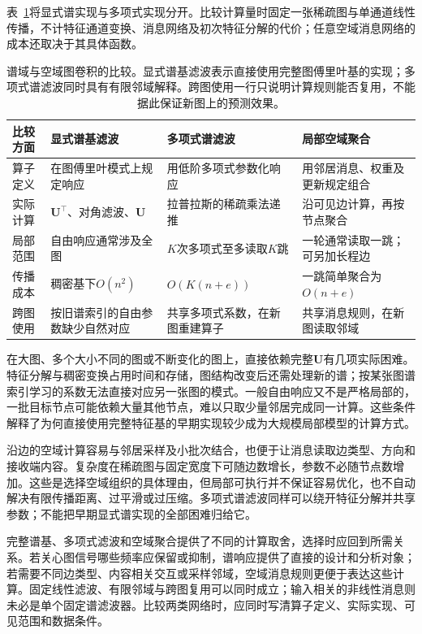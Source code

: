 表~\ref{tab:gnn-spectral-spatial}将显式谱实现与多项式实现分开。比较计算量时固定一张稀疏图与单通道线性传播，不计特征通道变换、消息网络及初次特征分解的代价；任意空域消息网络的成本还取决于其具体函数。
\begin{table}[htb]
  \centering
  \small
  \begin{tabularx}{\linewidth}{@{}p{17mm}XXX@{}}
    \toprule
    比较方面 & 显式谱基滤波 & 多项式谱滤波 & 局部空域聚合\\
    \midrule
    算子定义 & 在图傅里叶模式上规定响应 & 用低阶多项式参数化响应 & 用邻居消息、权重及更新规定组合\\
    实际计算 & $\bm{U}^{\top}$、对角滤波、$\bm{U}$ & 拉普拉斯的稀疏乘法递推 & 沿可见边计算，再按节点聚合\\
    局部范围 & 自由响应通常涉及全图 & $K$次多项式至多读取$K$跳 & 一轮通常读取一跳；可另加长程边\\
    传播成本 & 稠密基下$O(n^2)$ & $O(K(n+e))$ & 一跳简单聚合为$O(n+e)$\\
    跨图使用 & 按旧谱索引的自由参数缺少自然对应 & 共享多项式系数，在新图重建算子 & 共享消息规则，在新图读取邻域\\
    \bottomrule
  \end{tabularx}
  \caption{谱域与空域图卷积的比较。显式谱基滤波表示直接使用完整图傅里叶基的实现；多项式谱滤波同时具有有限邻域解释。跨图使用一行只说明计算规则能否复用，不能据此保证新图上的预测效果。}
  \label{tab:gnn-spectral-spatial}
\end{table}

在大图、多个大小不同的图或不断变化的图上，直接依赖完整$\bm{U}$有几项实际困难。特征分解与稠密变换占用时间和存储，图结构改变后还需处理新的谱；按某张图谱索引学习的系数无法直接对应另一张图的模式。一般自由响应又不是严格局部的，一批目标节点可能依赖大量其他节点，难以只取少量邻居完成同一计算。这些条件解释了为何直接使用完整特征基的早期实现较少成为大规模局部模型的计算方式。

沿边的空域计算容易与邻居采样及小批次结合，也便于让消息读取边类型、方向和接收端内容。复杂度在稀疏图与固定宽度下可随边数增长，参数不必随节点数增加。这些是选择空域组织的具体理由，但局部可执行并不保证容易优化，也不自动解决有限传播距离、过平滑或过压缩。多项式谱滤波同样可以绕开特征分解并共享参数；不能把早期显式谱实现的全部困难归给它。

完整谱基、多项式滤波和空域聚合提供了不同的计算取舍，选择时应回到所需关系。若关心图信号哪些频率应保留或抑制，谱响应提供了直接的设计和分析对象；若需要不同边类型、内容相关交互或采样邻域，空域消息规则更便于表达这些计算。固定线性滤波、有限邻域与跨图复用可以同时成立；输入相关的非线性消息则未必是单个固定谱滤波器。比较两类网络时，应同时写清算子定义、实际实现、可见范围和数据条件。

